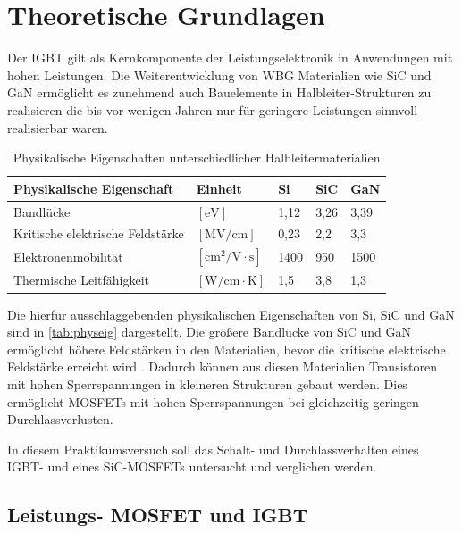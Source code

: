 
\chapter{Theoretische Grundlagen}\label{sec:theoriehl}

Der \gls{IGBT} gilt als Kernkomponente der Leistungselektronik in Anwendungen mit hohen Leistungen. Die Weiterentwicklung von \gls{WBG} Materialien wie \gls{SiC} und \gls{GaN} ermöglicht es zunehmend auch Bauelemente in Halbleiter-Strukturen zu realisieren die bis vor wenigen Jahren nur für geringere Leistungen sinnvoll realisierbar waren. 

\begin{table}[htb]
	\centering
	\caption{Physikalische Eigenschaften unterschiedlicher Halbleitermaterialien \cite{Lidowgan}}
	\label{tab:physeig}
	\begin{tabular}{|l|l|l|l|l|}
		\hline
		\textbf{Physikalische Eigenschaft} & \textbf{Einheit} & \textbf{Si} & \textbf{SiC} & \textbf{GaN}\\
		\hline
		Bandlücke & $\mathrm{[eV]}$ & 1,12 & 3,26 & 3,39 \\
		\hline
		Kritische elektrische Feldstärke & $\mathrm{[MV/cm]}$ & 0,23 & 2,2 & 3,3\\
		\hline
		Elektronenmobilität & $\mathrm{[cm^2/V \cdot s]}$ & 1400 & 950 & 1500 \\
		\hline
		Thermische Leitfähigkeit & $\mathrm{[W/cm \cdot K]}$ & 1,5 & 3,8 & 1,3 \\
		\hline
	\end{tabular}
\end{table}

Die hierfür ausschlaggebenden physikalischen Eigenschaften von \gls{Si}, \gls{SiC} und \gls{GaN} sind in \autoref{tab:physeig} dargestellt. Die größere Bandlücke von \gls{SiC} und \gls{GaN} ermöglicht höhere Feldstärken in den Materialien, bevor die kritische elektrische Feldstärke erreicht wird \cite{Lidowgan}. Dadurch können aus diesen Materialien Transistoren mit hohen Sperrspannungen in kleineren Strukturen gebaut werden. Dies ermöglicht \glspl{MOSFET} mit hohen Sperrspannungen bei gleichzeitig geringen Durchlassverlusten. 

In diesem Praktikumsversuch soll das Schalt- und Durchlassverhalten eines \gls{IGBT}- und eines \gls{SiC}-\glspl{MOSFET} untersucht und verglichen werden.


\section{Leistungs- MOSFET und IGBT}

